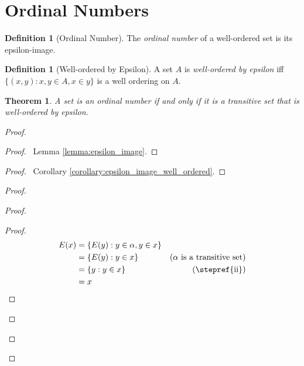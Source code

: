 \documentclass{article}
\let\qed\relax
\newtheorem{theorem}[axiom]{Theorem}
\theoremstyle{definition}
\newtheorem{definition}[axiom]{Definition}
\begin{document}
    \section{Ordinal Numbers}

    \begin{definition}[Ordinal Number]
        The \emph{ordinal number} of a well-ordered set is its epsilon-image.
    \end{definition}

    \begin{definition}[Well-ordered by Epsilon]
        A set $A$ is \emph{well-ordered by epsilon} iff $\{ (x,y) : x, y \in A, x \in y \}$ is a well
        ordering on $A$.
    \end{definition}

    \begin{theorem}
        A set is an ordinal number if and only if it is a transitive set that is well-ordered by epsilon.
    \end{theorem}

    \begin{proof}
        \pf
        \begin{proof}
            \pf\ Lemma \ref{lemma:epsilon_image}.
        \end{proof}
        \begin{proof}
            \pf\ Corollary \ref{corollary:epsilon_image_well_ordered}.
        \end{proof}
        \begin{proof}
            \begin{proof}
                \begin{proof}
                    \pf
                    \begin{align*}
                        E(x) & = \{ E(y) : y \in \alpha, y \in x \} \\
                        & = \{ E(y) : y \in x \} & (\text{$\alpha$ is a transitive set}) \\
                        & = \{ y : y \in x \} & (\text{\stepref{ii}}) \\
                        & = x
                    \end{align*}
                \end{proof}
            \end{proof}
        \end{proof}
        \qed
    \end{proof}
\end{document}
